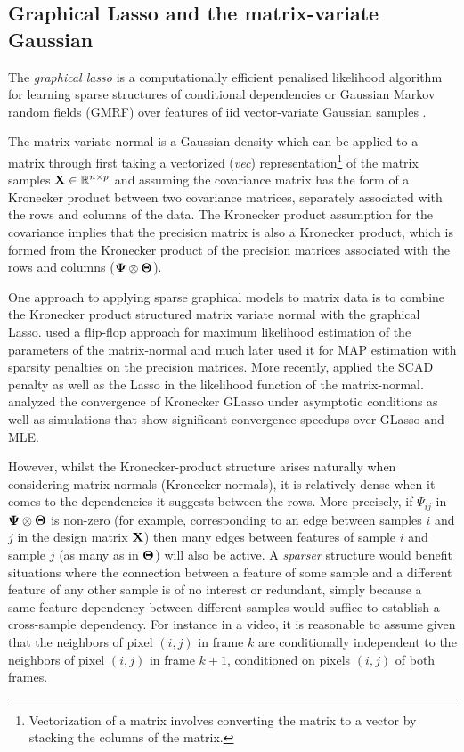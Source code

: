    \subsection{Graphical Lasso and the matrix-variate Gaussian}

      The \emph{graphical lasso} \citep[GLasso,][]{Friedman:sparse08, Banerjee:model2008} is a computationally efficient penalised likelihood algorithm for learning sparse structures of conditional dependencies or Gaussian Markov random fields (GMRF) over features of iid vector-variate Gaussian samples \citep{Lauritzen:graphical96}.

      The matrix-variate normal \citep{Dawid:MatrixVariate81, Gupta:MatrixVariate99} is a Gaussian density which can be applied to a matrix through first taking a vectorized (\emph{vec}) representation\footnote{Vectorization of a matrix involves converting the matrix to a vector by stacking the columns of the matrix.} of the matrix samples $\mathbf{X} \in \mathbb{R}^{n \times p}$ and assuming the covariance matrix has the form of a Kronecker product between two covariance matrices, separately associated with the rows and columns of the data. The Kronecker product assumption for the covariance implies that the precision matrix is also a Kronecker product, which is formed from the Kronecker product of the precision matrices associated with the rows and columns ($\mathbf{\Psi} \otimes \mathbf{\Theta}$).

      One approach to applying sparse graphical models to matrix data is to combine the Kronecker product structured matrix variate normal with the graphical Lasso.  \citet[MLE, ][]{Dutilleul:MLE99} used a flip-flop approach for maximum likelihood estimation of the parameters of the matrix-normal and much later \citet{Zhang:Learning10} used it for MAP estimation with sparsity penalties on the precision matrices.
    More recently, \citet{Leng:Sparse12} applied the SCAD penalty \citep{Fan:Variable01} as well as the Lasso in the likelihood function of the matrix-normal.
    \citet{Tsiligkaridis:Convergence13} analyzed the convergence of Kronecker GLasso under asymptotic conditions as well as simulations that show significant convergence speedups over GLasso and MLE.
    
    However, whilst the Kronecker-product structure arises naturally when considering matrix-normals (Kronecker-normals), it is relatively dense when it comes to the dependencies it suggests between the  rows.
    More precisely, if $\Psi_{ij}$ in $\mathbf{\Psi} \otimes \mathbf{\Theta}$ is non-zero (for example, corresponding to an edge between samples $i$ and $j$ in the design matrix $\mathbf{X}$) then many edges between features of sample $i$ and sample $j$ (as many as in $\mathbf{\Theta}$) will also be active.
    A \emph{sparser} structure would benefit situations where the connection between a feature of some sample and a different feature of any other sample is of no interest or redundant, simply because a same-feature dependency between different samples would suffice to establish a cross-sample dependency.
    For instance in a video, it is reasonable to assume given that the neighbors of pixel $(i,j)$ in frame $k$ are conditionally independent to the neighbors of pixel $(i,j)$ in frame $k+1$, conditioned on pixels $(i,j)$ of both frames.
    

